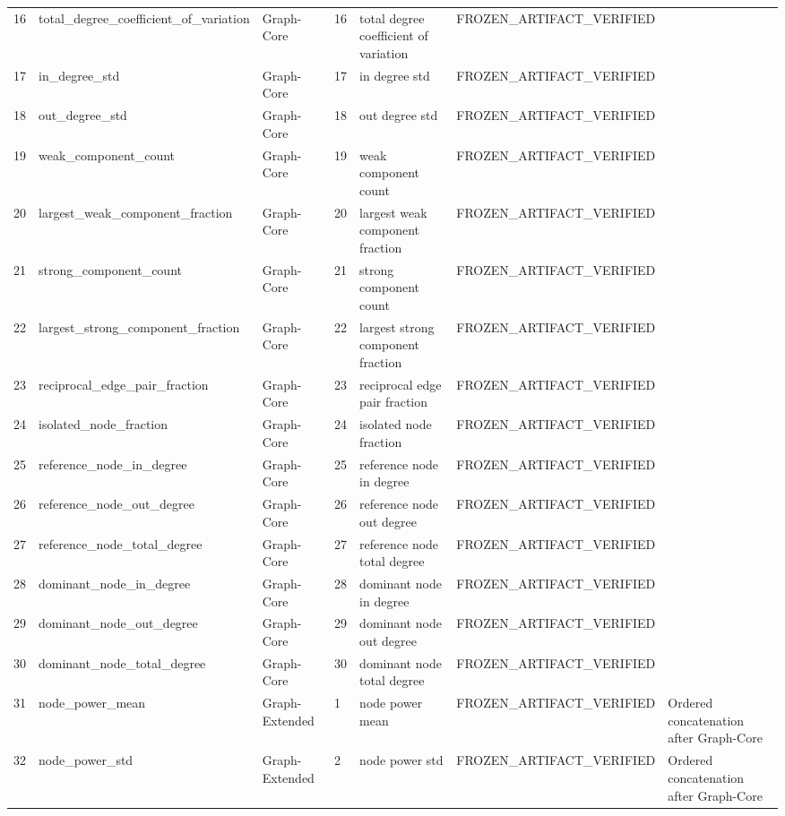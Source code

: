\begin{longtable}{lllllll}
16 & total\_degree\_coefficient\_of\_variation & Graph-Core & 16 & total degree coefficient of variation & FROZEN\_ARTIFACT\_VERIFIED &  \\
17 & in\_degree\_std & Graph-Core & 17 & in degree std & FROZEN\_ARTIFACT\_VERIFIED &  \\
18 & out\_degree\_std & Graph-Core & 18 & out degree std & FROZEN\_ARTIFACT\_VERIFIED &  \\
19 & weak\_component\_count & Graph-Core & 19 & weak component count & FROZEN\_ARTIFACT\_VERIFIED &  \\
20 & largest\_weak\_component\_fraction & Graph-Core & 20 & largest weak component fraction & FROZEN\_ARTIFACT\_VERIFIED &  \\
21 & strong\_component\_count & Graph-Core & 21 & strong component count & FROZEN\_ARTIFACT\_VERIFIED &  \\
22 & largest\_strong\_component\_fraction & Graph-Core & 22 & largest strong component fraction & FROZEN\_ARTIFACT\_VERIFIED &  \\
23 & reciprocal\_edge\_pair\_fraction & Graph-Core & 23 & reciprocal edge pair fraction & FROZEN\_ARTIFACT\_VERIFIED &  \\
24 & isolated\_node\_fraction & Graph-Core & 24 & isolated node fraction & FROZEN\_ARTIFACT\_VERIFIED &  \\
25 & reference\_node\_in\_degree & Graph-Core & 25 & reference node in degree & FROZEN\_ARTIFACT\_VERIFIED &  \\
26 & reference\_node\_out\_degree & Graph-Core & 26 & reference node out degree & FROZEN\_ARTIFACT\_VERIFIED &  \\
27 & reference\_node\_total\_degree & Graph-Core & 27 & reference node total degree & FROZEN\_ARTIFACT\_VERIFIED &  \\
28 & dominant\_node\_in\_degree & Graph-Core & 28 & dominant node in degree & FROZEN\_ARTIFACT\_VERIFIED &  \\
29 & dominant\_node\_out\_degree & Graph-Core & 29 & dominant node out degree & FROZEN\_ARTIFACT\_VERIFIED &  \\
30 & dominant\_node\_total\_degree & Graph-Core & 30 & dominant node total degree & FROZEN\_ARTIFACT\_VERIFIED &  \\
31 & node\_power\_mean & Graph-Extended & 1 & node power mean & FROZEN\_ARTIFACT\_VERIFIED & Ordered concatenation after Graph-Core \\
32 & node\_power\_std & Graph-Extended & 2 & node power std & FROZEN\_ARTIFACT\_VERIFIED & Ordered concatenation after Graph-Core \\

\end{longtable}
